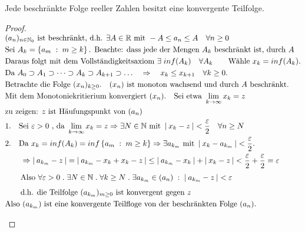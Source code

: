 \documentclass[a4paper,titlepage,oneside]{article}
\def\N{\ensuremath{\mathbb{N}} }
\def\R{\ensuremath{\mathbb{R}} }
\renewcommand{\epsilon}{\ensuremath{\varepsilon} }
\def\zz{\text{zu zeigen: }}
\def\sp{\hspace{0,1cm}}
\def\spdot{\sp.\sp}
\def\spcolon{\sp:\sp}
\renewcommand{\liminf}[2][n]{\ensuremath{\lim\limits_{#1 \rightarrow \infty}{#2}}}
\newcommand{\abs}[1]{\ensuremath{\left|\:#1\:\right|}}
\newcommand{\menge}[2]{\ensuremath{\left\{#1\sp : \sp #2\right\}}}
\theoremstyle{thmstyle}
\begin{document}
\begin{subsatz}
Jede beschränkte Folge reeller Zahlen besitzt eine konvergente Teilfolge.
\begin{proof}
\begin{math} \displaystyle
\begin{aligned}[t]
&(a_n)_{n \in \N_0} \text{ ist beschränkt, d.h. }\exists A \in \R \text{ mit }-A \le a_n \le A \quad \forall n \ge 0\\
&\text{Sei } A_k = \menge{a_m}{m \ge k} \text{. Beachte: dass jede der Mengen } A_k \text{ beschränkt ist, durch }A\\
&\text{Daraus folgt mit dem Vollständigkeitsaxiom } \exists \sp inf(A_k) \quad \forall A_k \qquad \text{Wähle } x_k = inf(A_k). \\
&\text{Da } A_0 \supset A_1 \supset \dots \supset A_k \supset A_{k+1} \supset \dots \quad \Rightarrow \quad x_k \le x_{k+1} \quad \forall k \ge 0.\\
&\text{Betrachte die Folge }(x_n)_{k \ge 0}. \quad (x_n) \text{ ist monoton wachsend und durch $A$ beschränkt.}\\
&\text{Mit dem Monotoniekritierium konvergiert } (x_n). \quad \text{Sei etwa } \liminf[k]{x_k} = z\\
&\zz z \text{ ist Häufungspunkt von } (a_n) \\
&\begin{aligned}[t]
& 1. &&\text{Sei } \epsilon > 0 \text{ , da } \liminf[k]{x_k} = z \Rightarrow \exists N \in \N \text{ mit } \abs{x_k - z} < \frac{\epsilon}{2} \quad \forall n \ge N \\
& 2. &&\text{Da }x_k = inf(A_k) = inf\menge{a_m}{m \ge k} \Rightarrow \exists a_{k_m} \text{ mit } \abs{x_k - a_{k_m}} < \frac{\epsilon}{2}.
\end{aligned} \\ \vphantom{\frac{\epsilon}{2}}
&\qquad \Rightarrow \abs{a_{k_m} - z} = \abs{a_{k_m} - x_k + x_k - z} \le \abs{a_{k_m} - x_k} + \abs{x_k - z} < \frac{\epsilon}{2} + \frac{\epsilon}{2} = \epsilon  \\ \vphantom{\frac{\epsilon}{2}}
&\qquad \text{Also } \forall \epsilon > 0 \spdot \exists N \in \N \spdot \forall k \ge N \spdot \exists a_{k_m} \in (a_n) \spcolon \abs{a_{k_m} - z} < \epsilon  \\
&\qquad \text{d.h. die Teilfolge }(a_{k_m})_{m\ge 0}\text{ ist konvergent gegen } z \\
&\text{Also }(a_{k_m})\text{ ist eine konvergente Teilfloge von der beschränkten Folge }(a_n).
\end{aligned} \\
\end{math}
\begin{figure}[h!] \begin{center}  \end{center}\end{figure}
\end{proof}
\end{subsatz}
\end{document}
